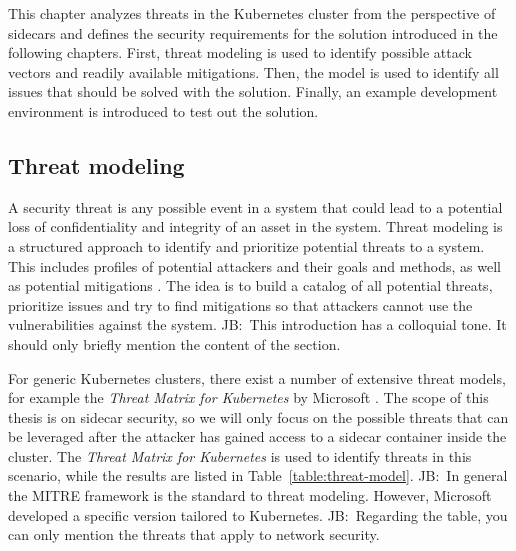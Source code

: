 \documentclass[english, 12pt, a4paper, sci, utf8, a-2b, online]{aaltothesis}
\newcommand{\mycomment}[3]{\textcolor{#1}{#2:~#3}}
\newcommand{\jb}[1]{\noindent\mycomment{aaltoRed}{JB}{#1}}
\begin{document}
This chapter analyzes threats in the Kubernetes cluster from the perspective of sidecars and defines the security requirements for the solution introduced in the following chapters.
First, threat modeling is used to identify possible attack vectors and readily available mitigations.
Then, the model is used to identify all issues that should be solved with the solution.
Finally, an example development environment is introduced to test out the solution.

\subsection{Threat modeling}

A security threat is any possible event in a system that could lead to a potential loss of confidentiality and integrity of an asset in the system.
Threat modeling is a structured approach to identify and prioritize potential threats to a system.
This includes profiles of potential attackers and their goals and methods, as well as potential mitigations \cite{shevchenko2018threat}.
The idea is to build a catalog of all potential threats, prioritize issues and try to find mitigations so that attackers cannot use the vulnerabilities against the system. \jb{This introduction has a colloquial tone. It should only briefly mention the content of the section.}

For generic Kubernetes clusters, there exist a number of extensive threat models, for example the \emph{Threat Matrix for Kubernetes} by Microsoft \cite{k8s-threat-matrix}.
The scope of this thesis is on sidecar security, so we will only focus on the possible threats that can be leveraged after the attacker has gained access to a sidecar container inside the cluster.
The \emph{Threat Matrix for Kubernetes} is used to identify threats in this scenario, while the results are listed in Table~\ref{table:threat-model}. \jb{In general the MITRE framework is the standard to threat modeling. However, Microsoft developed a specific version tailored to Kubernetes.}
\jb{Regarding the table, you can only mention the threats that apply to network security.}
\end{document}
